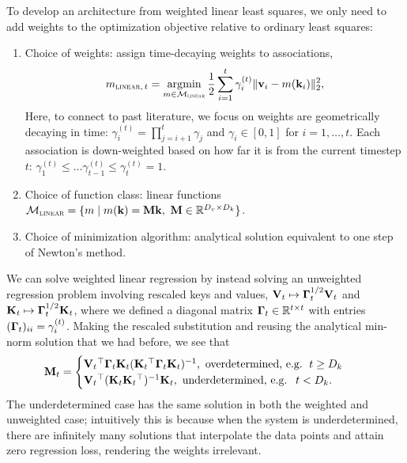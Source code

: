 \documentclass[notitlepage, 11pt]{article}
\newcommand*{\memory}{{m}}
\newcommand*{\dkey}{{D_k}}
\newcommand*{\dval}{{D_v}}
\newcommand*{\linearfunctions}{{\Mcal_{\textsc{linear}}}}
\begin{document}
To develop an architecture from weighted linear least squares, we only need to add weights to the optimization objective relative to ordinary least squares:
\begin{enumerate}
    \item Choice of weights: assign time-decaying weights to associations,  \begin{align}\memory_{\textsc{linear},\,t} = \argmin_{\memory\in \linearfunctions} \frac{1}{2}\sum_{i=1}^t \gamma_{i}^{(t)}\norm{\vbf_i - \memory(\kbf_i)}_2^2,\label{eqn:decaying-ols}\end{align}
    Here, to connect to past literature, we focus on weights are geometrically decaying in time: $\gamma_{i}^{(t)} = \prod_{j=i+1}^t \gamma_j$ and $\gamma_i \in [0, 1]$ for $i=1, \ldots, t$. Each association is down-weighted based on how far it is from the current timestep $t$: $\gamma_1^{(t)} \leq \ldots \gamma_{t-1}^{(t)} \leq \gamma_t^{(t)} = 1$.
    \item Choice of function class: linear functions $\linearfunctions = \{\memory\mid \memory(\kbf) = \Mbf \kbf,\ \Mbf \in \reals^{\dval\times\dkey}\}$.
    \item Choice of minimization algorithm: analytical solution equivalent to one step of Newton's method.
\end{enumerate}
We can solve weighted linear regression by instead solving an unweighted regression problem involving rescaled keys and values, $\mathbf{V}_t\mapsto \boldsymbol{\Gamma}_t^{1/2}\mathbf{V}_t$ and $\mathbf{K}_t\mapsto \boldsymbol{\Gamma}_t^{1/2}\mathbf{K}_t$, where we defined a diagonal matrix $\boldsymbol{\Gamma}_t\in \mathbb{R}^{t\times t}$ with entries $(\boldsymbol{\Gamma}_t)_{ii} = \gamma_{i}^{(t)}$.
Making the rescaled substitution and reusing the analytical min-norm solution that we had before, we see that \begin{align}
    \Mbf_t &= 
    \begin{cases}
        \Vbf_t\transpose \Gammabf_t \Kbf_t(\Kbf_t\transpose\Gammabf_t\Kbf_t)\inverse, \ \text{overdetermined, e.g. }\, t \geq \dkey\\
        \Vbf_t\transpose (\Kbf_t\Kbf_t\transpose)\inverse\Kbf_t, \ \text{underdetermined, e.g. }\ t < \dkey.
    \end{cases}\label{eqn:optimal-linear-memory-weighted}
\end{align}
The underdetermined case has the same solution in both the weighted and unweighted case; intuitively this is because when the system is underdetermined, there are infinitely many solutions that interpolate the data points and attain zero regression loss, rendering the weights irrelevant.
\end{document}
